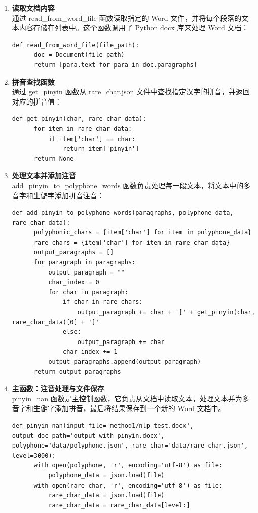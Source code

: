 \documentclass[12pt,hyperref,a4paper,UTF8]{ctexart}
\begin{document}
\begin{enumerate}
    \item \textbf{读取文档内容}\\
  通过 read\_from\_word\_file 函数读取指定的 Word 文件，并将每个段落的文本内容存储在列表中。这个函数调用了 Python docx 库来处理 Word 文档：
    \begin{lstlisting}[caption={读取文档内容实现代码}, label={lst:example}]
  def read_from_word_file(file_path):
      doc = Document(file_path)
      return [para.text for para in doc.paragraphs]
  \end{lstlisting}
    \item \textbf{拼音查找函数}\\
    通过 get\_pinyin 函数从 rare\_char.json 文件中查找指定汉字的拼音，并返回对应的拼音值：
    \begin{lstlisting}[caption={拼音查找函数实现代码}, label={lst:example}]
  def get_pinyin(char, rare_char_data):
      for item in rare_char_data:
          if item['char'] == char:
              return item['pinyin']
      return None  
  \end{lstlisting}
    \item \textbf{处理文本并添加注音}\\
    add\_pinyin\_to\_polyphone\_words 函数负责处理每一段文本，将文本中的多音字和生僻字添加拼音注音：
    \begin{lstlisting}[caption={处理文本并添加注音实现代码}, label={lst:example}]
  def add_pinyin_to_polyphone_words(paragraphs, polyphone_data, rare_char_data):
      polyphonic_chars = {item['char'] for item in polyphone_data}
      rare_chars = {item['char'] for item in rare_char_data}
      output_paragraphs = []
      for paragraph in paragraphs:
          output_paragraph = ""
          char_index = 0
          for char in paragraph:
              if char in rare_chars:
                  output_paragraph += char + '[' + get_pinyin(char, rare_char_data)[0] + ']'
              else:
                  output_paragraph += char
              char_index += 1
          output_paragraphs.append(output_paragraph)
      return output_paragraphs
  \end{lstlisting}
    \item \textbf{主函数：注音处理与文件保存}\\
    pinyin\_nan 函数是主控制函数，它负责从文档中读取文本，处理文本并为多音字和生僻字添加拼音，最后将结果保存到一个新的 Word 文档中。
    \begin{lstlisting}[caption={注音处理与文件保存实现代码}, label={lst:example}]
  def pinyin_nan(input_file='method1/nlp_test.docx', output_doc_path='output_with_pinyin.docx', polyphone='data/polyphone.json', rare_char='data/rare_char.json', level=3000):
      with open(polyphone, 'r', encoding='utf-8') as file:
          polyphone_data = json.load(file)
      with open(rare_char, 'r', encoding='utf-8') as file:
          rare_char_data = json.load(file)
          rare_char_data = rare_char_data[level:]
  

\end{lstlisting}
\end{enumerate}
\end{document}
